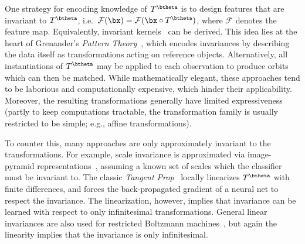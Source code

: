 \documentclass[twoside]{article}
\begin{document}
  One strategy for encoding knowledge of $T^{\btheta}$ is to design features that are
  invariant to $T^{\btheta}$, 
  i.e.~$\mathcal{F}({\bx}) = \mathcal{F}({\bx} \circ T^{\btheta})$,
  where $\mathcal{F}$ denotes the feature map. Equivalently, invariant kernels~\cite{chapelle:nips:2001} 
  can be derived. This idea lies at the heart of
  Grenander's \emph{Pattern Theory}~\cite{grenander:book:1993}, which encodes invariances
  by describing the data itself as transformations acting on reference objects.
  Alternatively, all instantiations of $T^{\btheta}$ may be applied to each observation
  to produce orbits~\cite{graepel:nips:2004, liao:nips:2013} which can then be matched.
  While mathematically elegant, these approaches tend to be laborious and computationally
  expensive, which hinder their applicability. Moreover, the resulting transformations
  generally have limited expressiveness (partly to keep computations tractable,
  the transformation family is usually restricted to be simple; e.g., affine transformations).
  
  To counter this, many approaches are only approximately invariant to 
  the transformations. For example, scale invariance is approximated via image-pyramid
  representations~\cite{kanazawa:arxiv:2014, farabet:pami:2013}, assuming
  a known set of scales which the classifier must be invariant to.
  The classic \emph{Tangent Prop}~\cite{simard1992tangent}
  locally linearizes $T^{\btheta}$ with finite differences, and forces the back-propagated
  gradient of a neural net to respect the invariance. The linearization, however,
  implies that invariance can 
  be learned  
  with respect to only infinitesimal 
  transformations. General linear invariances 
  are also used 
  for restricted
  Boltzmann machines~\cite{sohn:icml:2012, kivinen:icann:2011}, but again the
  linearity implies that the invariance is only infinitesimal.
  
\end{document}
